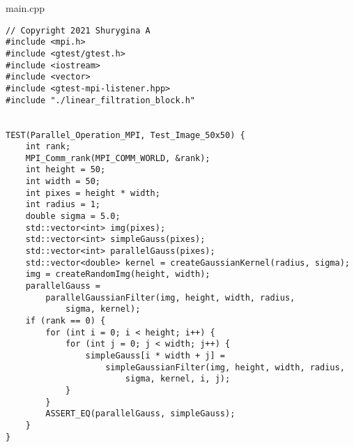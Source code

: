 \documentclass{report}
\begin{document}
main.cpp
\begin{lstlisting}
// Copyright 2021 Shurygina A
#include <mpi.h>
#include <gtest/gtest.h>
#include <iostream>
#include <vector>
#include <gtest-mpi-listener.hpp>
#include "./linear_filtration_block.h"


TEST(Parallel_Operation_MPI, Test_Image_50x50) {
    int rank;
    MPI_Comm_rank(MPI_COMM_WORLD, &rank);
    int height = 50;
    int width = 50;
    int pixes = height * width;
    int radius = 1;
    double sigma = 5.0;
    std::vector<int> img(pixes);
    std::vector<int> simpleGauss(pixes);
    std::vector<int> parallelGauss(pixes);
    std::vector<double> kernel = createGaussianKernel(radius, sigma);
    img = createRandomImg(height, width);
    parallelGauss =
        parallelGaussianFilter(img, height, width, radius,
            sigma, kernel);
    if (rank == 0) {
        for (int i = 0; i < height; i++) {
            for (int j = 0; j < width; j++) {
                simpleGauss[i * width + j] =
                    simpleGaussianFilter(img, height, width, radius,
                        sigma, kernel, i, j);
            }
        }
        ASSERT_EQ(parallelGauss, simpleGauss);
    }
}


\end{lstlisting}
\end{document}
